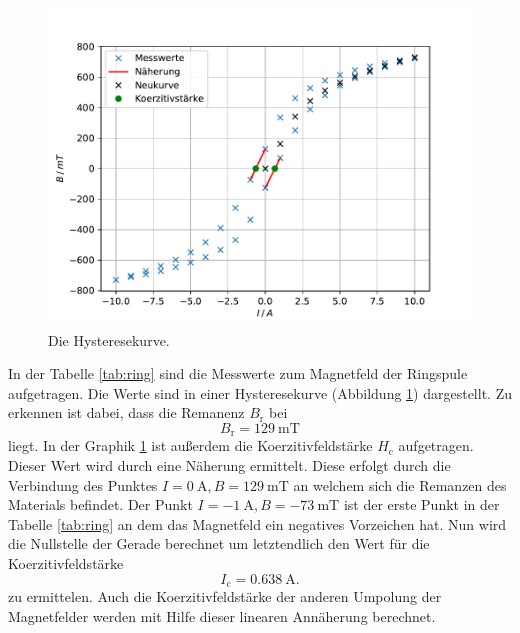\begin{figure}
\centering
\includegraphics[width=\textwidth]{content/data/plot_ring.pdf}
\caption{Die Hysteresekurve.}
\label{fig:ring}
\end{figure}

In der Tabelle \ref{tab:ring} sind die Messwerte zum Magnetfeld der Ringspule aufgetragen.
Die Werte sind in einer Hysteresekurve (Abbildung \ref{fig:ring}) dargestellt.
Zu erkennen ist dabei, dass die Remanenz $B_\text{r}$ bei 
\begin{equation*}
  B_\text{r} =\SI{129}{\milli\tesla}
\end{equation*}
liegt.
In der Graphik \ref{fig:ring} ist außerdem die Koerzitivfeldstärke $H_\text{c}$ aufgetragen.
Dieser Wert wird durch eine Näherung ermittelt.
Diese erfolgt durch die Verbindung des Punktes $I=\SI{0}{\ampere}, B=\SI{129}{\milli\tesla}$ an welchem sich die Remanzen des Materials befindet.
Der Punkt $I=\SI{-1}{\ampere}, B=\SI{-73}{\milli\tesla}$ ist der erste Punkt in der Tabelle \ref{tab:ring} an dem das Magnetfeld ein negatives Vorzeichen hat.
Nun wird die Nullstelle der Gerade berechnet um letztendlich den Wert für die Koerzitivfeldstärke
\begin{equation*}
  I_\text{c} =\SI{0.638}{\ampere}.
\end{equation*}
zu ermittelen.
Auch die Koerzitivfeldstärke der anderen Umpolung der Magnetfelder werden mit Hilfe dieser linearen Annäherung berechnet.
